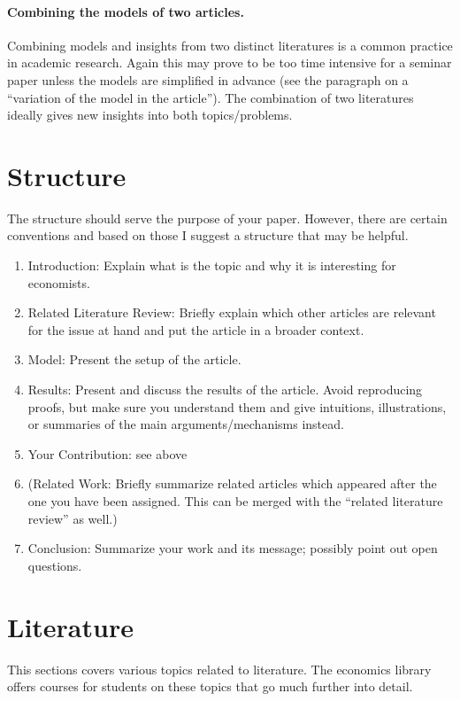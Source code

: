 \documentclass[a4paper,11pt]{article}
\begin{document}
\paragraph{Combining the models of two articles.} Combining models and insights from two distinct literatures is a common practice in academic research. Again this may prove to be too time intensive for a seminar paper unless the models are simplified in advance (see the paragraph on a ``variation of the model in the article''). The combination of two literatures ideally gives new insights into both topics/problems. 

\section{Structure}
\label{sec:structure}

The structure should serve the purpose of your paper. However, there are certain conventions and based on those I suggest a structure that may be helpful.

\begin{enumerate}
\item Introduction: Explain what is the topic and why it is interesting for economists.
 \item  Related Literature Review: Briefly explain which other articles
  are relevant for the issue at hand and put the article in a broader context.
 \item  Model: Present the setup of the article.
 \item  Results: Present and discuss the results of the article. Avoid reproducing proofs, but make sure you understand them and give intuitions, illustrations, or summaries of the main arguments/mechanisms instead.
\item  Your Contribution: see above
  \item (Related Work: Briefly summarize related articles which appeared after the one you have been assigned. This can be merged with the ``related literature review'' as well.)
  \item Conclusion: Summarize your work and its message; possibly point out open
  questions.
\end{enumerate}

\section{Literature}
\label{sec:literature}
This sections covers various topics related to literature. The economics library offers courses for students on these topics that go much further into detail.
\end{document}
